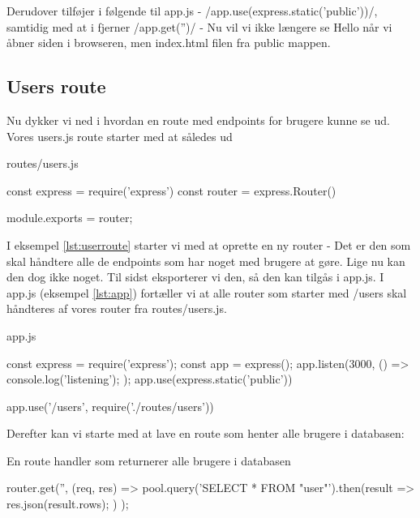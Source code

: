 \documentclass[english,course]{lecture}
\begin{document}
Derudover tilføjer i følgende til app.js - 
\jsinline/app.use(express.static('public'))/, samtidig med at i fjerner \jsinline/app.get('')/ - Nu vil vi ikke længere se Hello når vi åbner siden i browseren, men index.html filen fra public mappen.

\subsection{Users route}

Nu dykker vi ned i hvordan en route med endpoints for brugere kunne se ud. Vores users.js route starter med at således ud

\begin{listing}[H]
\caption{routes/users.js}
\label{lst:userroute}
\begin{jscode}
const express = require('express')
const router = express.Router()

module.exports = router;
\end{jscode}
\end{listing}

I eksempel \ref{lst:userroute} starter vi med at oprette en ny router - Det er den som skal håndtere alle de endpoints som har noget med brugere at gøre. Lige nu kan den dog ikke noget. Til sidst eksporterer vi den, så den kan tilgås i app.js. I app.js (eksempel \ref{lst:app}) fortæller vi at alle router som starter med /users skal håndteres af vores router fra routes/users.js.

\begin{listing}[H]
\caption{app.js}
\label{lst:app}
\begin{jscode}
const express = require('express');
const app = express();
app.listen(3000, () => {
	console.log('listening');
});
app.use(express.static('public'))

app.use('/users', require('./routes/users'))
\end{jscode}
\end{listing}

Derefter kan vi starte med at lave en route som henter alle brugere i databasen:

\begin{listing}[H]
\caption{En route handler som returnerer alle brugere i databasen}
\begin{jscode}
router.get('', (req, res) => {
	pool.query('SELECT * FROM "user"').then(result => {
		res.json(result.rows);
	})
});
\end{jscode}
\end{listing}
\end{document}
